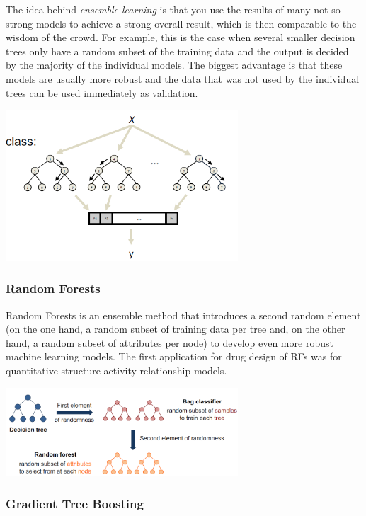The idea behind \emph{ensemble learning} is that you use the results of many not-so-strong models to achieve a strong overall result, which is then comparable to the wisdom of the crowd. For example, this is the case when several smaller decision trees only have a random subset of the training data and the output is decided by the majority of the individual models. The biggest advantage is that these models are usually more robust and the data that was not used by the individual trees can be used immediately as validation.

\begin{center}\includegraphics[width=0.65\textwidth]{img/machine/MachineEnsemble.png}\end{center}

\subsubsection{Random Forests}

Random Forests is an ensemble method that introduces a second random element (on the one hand, a random subset of training data per tree and, on the other hand, a random subset of attributes per node) to develop even more robust machine learning models. The first application for drug design of RFs was for quantitative structure-activity relationship models.

\begin{center}\includegraphics[width=0.65\textwidth]{img/machine/MachineEnsembleRandomForests.png}\end{center}

\subsubsection{Gradient Tree Boosting}

